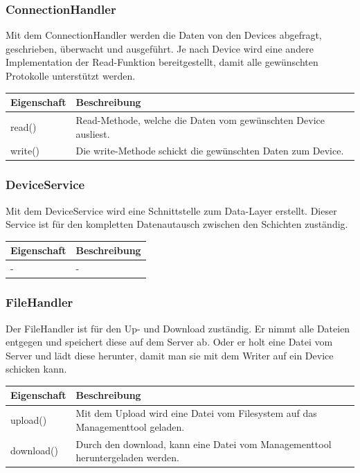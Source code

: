 \subsubsection{ConnectionHandler}
Mit dem ConnectionHandler werden die Daten von den Devices abgefragt, geschrieben, überwacht und ausgeführt. Je nach Device wird eine andere Implementation der Read-Funktion bereitgestellt, damit alle gewünschten Protokolle unterstützt werden.
\noindent \begin{table}[H]
\centering
    \begin{tabular}{@{}l p{14.1cm} @{}}\toprule    
    {Eigenschaft} & {Beschreibung}\\ \midrule      
    read() & Read-Methode, welche die Daten vom gewünschten Device ausliest.\\
    write() & Die write-Methode schickt die gewünschten Daten zum Device. \\
    \bottomrule
    \end{tabular}
\end{table}



\subsubsection{DeviceService}
Mit dem DeviceService wird eine Schnittstelle zum Data-Layer erstellt. Dieser Service ist für den kompletten Datenautausch zwischen den Schichten zuständig.\begin{table}[H]
\centering
    \begin{tabular}{@{}l p{14.1cm} @{}}\toprule    
    {Eigenschaft} & {Beschreibung}\\ \midrule 
    - & -
   \\ \bottomrule
    \end{tabular}
\end{table}




\subsubsection{FileHandler}
Der FileHandler ist für den Up- und Download zuständig. Er nimmt alle Dateien entgegen und speichert diese auf dem Server ab. Oder er holt eine Datei vom Server und lädt diese herunter, damit man sie mit dem Writer auf ein Device schicken kann.
\begin{table}[H]
\centering
    \begin{tabular}{@{}l p{14.1cm} @{}}\toprule    
    {Eigenschaft} & {Beschreibung}\\ \midrule 
    upload() & Mit dem Upload wird eine Datei vom Filesystem auf das Managementtool geladen. \\
    download() & Durch den download, kann eine Datei vom Managementtool heruntergeladen werden. \\
    \bottomrule
    \end{tabular}
\end{table}

